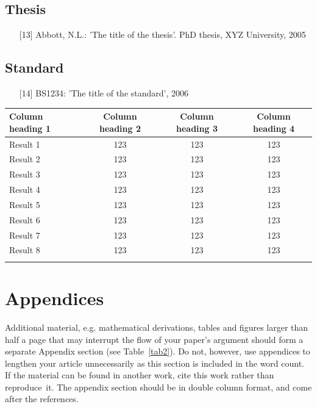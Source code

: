 \documentclass{cta-author}
\begin{document}
\subsection{Thesis}\label{subsec13.7}

\begin{enumerate}
\item[{[13]}]
Abbott, N.L.: 'The title of the thesis'. PhD thesis, XYZ University,
2005
\end{enumerate}

\subsection{Standard}\label{subsec13.8}

\begin{enumerate}
\item[{[14]}] BS1234: 'The title of the standard', 2006
\end{enumerate}

\begin{table}[!h]
{\begin{tabular*}{\textwidth}{@{\extracolsep{\fill}}lccc}\toprule
Column heading 1 &Column heading 2 & Column heading 3  & Column heading 4\\
\midrule
Result 1 &123 &123 & 123 \\
Result 2 &123 &123 &123 \\
Result 3 &123 &123 &123 \\
Result 4 &123 &123 &123 \\
Result 5 &123 &123 &123 \\
Result 6 &123 &123 &123 \\
Result 7 &123 &123 &123 \\
Result 8 &123 &123 &123 \\
\botrule
\end{tabular*}}{}
\end{table}

\vfill\pagebreak

\section{Appendices}\label{sec14}

Additional material, e.g. mathematical derivations, tables and figures
larger than half a page that may interrupt the flow of your paper's argument
should form a separate Appendix section (see Table~\ref{tab2}). Do not, however, use
appendices to lengthen your article unnecessarily as this section is
included in the word count. If the material can be found in another work,
cite this work rather than reproduce~it.
The appendix section should be in double column format, and come after the references.
\end{document}
